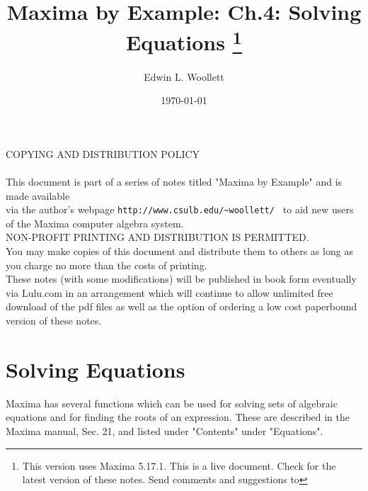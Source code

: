 \documentclass[12pt]{article}
\title{Maxima by Example: Ch.4: Solving Equations \thanks{This version uses Maxima 5.17.1. This is a live
            document. Check \;  \tedhome \; for the latest version of these notes. Send comments and
			 suggestions to \tedmail } }
\author{Edwin L. Woollett}
\date{\today}
\begin{document}
\small
\maketitle
\tableofcontents
{}
\newpage

\setcounter{section}{3}
\normalsize
COPYING AND DISTRIBUTION POLICY\\
\\    
	
    
    This document is part of a series of notes titled
    "Maxima by Example" and	is made available\\
	via the author's webpage 
	\verb|http://www.csulb.edu/~woollett/ | to aid
	new users of the Maxima computer algebra system.\\
	
	\smallskip
	NON-PROFIT PRINTING AND DISTRIBUTION IS PERMITTED.\\
	You may make copies of this document and distribute them to others
	as long as you charge no more than the costs of printing.\\
	
	\smallskip
	These notes (with some modifications) will be published in book form
	eventually via Lulu.com in an arrangement which will continue
	to allow unlimited free download of the pdf files as well as the option
	of ordering a low cost paperbound version of these notes.
\newpage

\section{Solving Equations}
Maxima has several functions which can be used for solving sets of algebraic equations and
  for finding the roots of an expression.
These are described in the Maxima manual, Sec. 21, and listed under "Contents" under "Equations".\\
\end{document}
